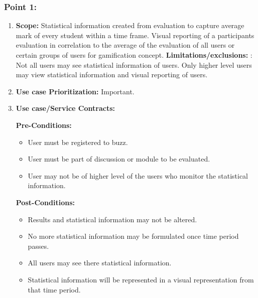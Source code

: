 \documentclass[11pt]{article}
\begin{document}
\subsubsection{Point 1:}
\begin{enumerate}
\item 
\textbf{Scope:}
Statistical information created from evaluation to capture average mark of every student within a time frame. Visual reporting of a participants evaluation in correlation to the average of the evaluation of all users or certain groups of users for gamification concept.
\newline
\textbf{Limitations/exclusions:} : Not all users may see statistical information of users. Only higher level users may view statistical information and visual reporting of users.

\item 
\textbf{Use case Prioritization:} Important.

\item 
\textbf{Use case/Service Contracts:} 

\textbf{Pre-Conditions: }
\begin{itemize}
\item User must be registered to buzz.

\item User must be part of discussion or module to be evaluated.

\item User may not be of higher level of the users who monitor the statistical information.


\end{itemize}
 

\textbf{Post-Conditions: }
\begin{itemize}

\item Results and statistical information may not be altered.
\item No more statistical information may be formulated once time period passes.
\item All users may see there statistical information.
\item Statistical information will be represented in a visual representation from that time period.



\end{itemize}
\end{enumerate}
\end{document}
